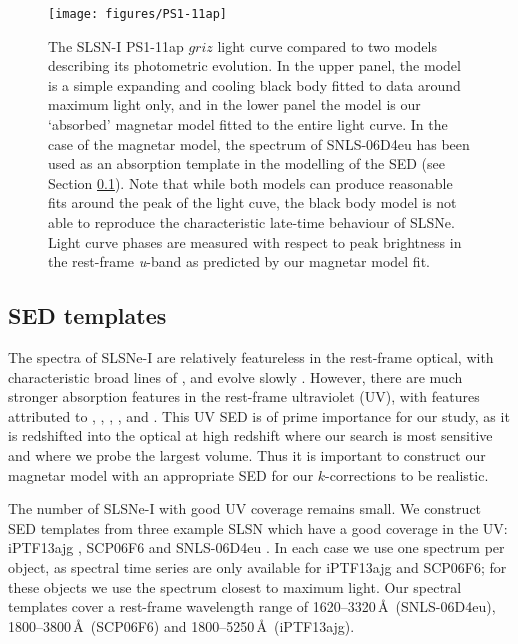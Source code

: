 \begin{figure}
\texttt{[image: figures/PS1-11ap]}
\caption{The SLSN-I PS1-11ap $griz$ light curve
  \citep{2014MNRAS.437..656M} compared to two models describing its
  photometric evolution. In the upper panel, the model is a simple
  expanding and cooling black body fitted to data around maximum light
  only, and in the lower panel the model is our `absorbed' magnetar
  model fitted to the entire light curve. In the case of the magnetar model, the spectrum of
  SNLS-06D4eu \citep{2013ApJ...779...98H} has been used as an
  absorption template in the modelling of the SED (see Section
  \ref{sec:KCorrection}). Note that while both models can produce
  reasonable fits around the peak of the light cuve, the black body
  model is not able to reproduce the characteristic late-time
  behaviour of SLSNe. Light curve phases are measured with respect to peak brightness in the rest-frame \textit{u}-band as predicted by our magnetar model fit.}
\label{fig:PS1-11ap}
\end{figure}

\subsection{SED templates}
\label{sec:KCorrection}

The spectra of SLSNe-I are relatively featureless in the rest-frame
optical, with characteristic broad lines of , and evolve slowly
\citep{2011ApJ...743..114C,2013ApJ...779...98H,2015MNRAS.449.1215P,2014ApJ...797...24V}.
However, there are much stronger absorption features in the rest-frame
ultraviolet (UV), with features attributed to ,
, , ,  and
 \citep[see][for line
identifications]{2016MNRAS.458.3455M}. This UV SED is of prime
importance for our study, as it is redshifted into the optical at high
redshift where our search is most sensitive and where we probe the
largest volume. Thus it is important to construct our magnetar model
with an appropriate SED for our $k$-corrections to be realistic.


The number of SLSNe-I with good UV coverage remains small. We
construct SED templates from three example SLSN which have a good
coverage in the UV: iPTF13ajg \citep{2014ApJ...797...24V}, SCP06F6
\citep{2009ApJ...690.1358B} and SNLS-06D4eu
\citep{2013ApJ...779...98H}. In each case we use one spectrum per
object, as spectral time series are only available for iPTF13ajg and
SCP06F6; for these objects we use the spectrum closest to maximum
light. Our spectral templates cover a rest-frame wavelength range of
1620--3320\,\AA\ (SNLS-06D4eu), 1800--3800\,\AA\ (SCP06F6) and
1800--5250\,\AA\ (iPTF13ajg).

